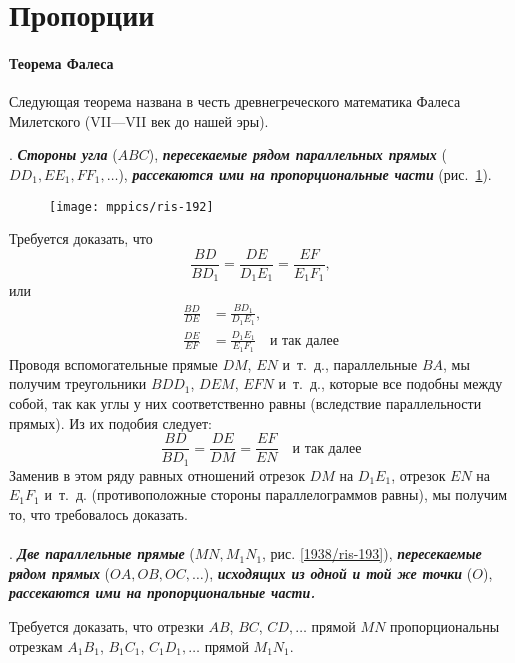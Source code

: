 \section{Пропорции} 

\paragraph{Теорема Фалеса}\label{1938/182}
Следующая теорема названа в честь древнегреческого математика Фалеса Милетского (VII—VII век до нашей эры).


\smallskip
{}.
\textbf{\emph{Стороны угла}} ($ABC$), \textbf{\emph{пересекаемые рядом параллельных прямых}} ($DD_1, EE_1, FF_1, \dots$), \textbf{\emph{рассекаются ими на пропорциональные части}} (рис.~\ref{1938/ris-192}).

\begin{figure}[!ht]
\centering
\texttt{[image: mppics/ris-192]}
\caption{}\label{1938/ris-192}
\end{figure}

Требуется доказать, что
\[\frac{BD}{BD_1}=\frac{DE}{D_1E_1}=\frac{EF}{E_1F_1},\]
или
\begin{align*}
\frac{BD}{DE}&=\frac{BD_1}{D_1E_1},
\\
\frac{DE}{EF}&=\frac{D_1E_1}{E_1F_1}\quad\text{и так далее}
\end{align*}
Проводя вспомогательные прямые $DM$, $EN$ и~т.~д., параллельные $BA$, мы получим треугольники $BDD_1$, $DEM$, $EFN$ и~т.~д., которые все подобны между собой, так как углы у них соответственно равны (вследствие параллельности прямых).
Из их подобия следует:
\[\frac{BD}{BD_1}=\frac{DE}{DM}=\frac{EF}{EN}\quad\text{и так далее}\]
Заменив в этом ряду равных отношений отрезок $DM$ на $D_1E_1$, отрезок $EN$ на $E_1F_1$ и~т.~д.
(противоположные стороны параллелограммов равны), мы получим то, что требовалось доказать.

\paragraph{}\label{1938/183}
.
\textbf{\emph{Две параллельные прямые}} ($MN, M_1N_1$, рис. \ref{1938/ris-193}), \textbf{\emph{пересекаемые рядом прямых}} ($OA, OB, OC, \dots$), \textbf{\emph{исходящих из одной и той же точки}} ($O$), \textbf{\emph{рассекаются ими на пропорциональные части.}}


Требуется доказать, что отрезки $AB$, $BC$, $CD,\dots$
прямой $MN$ пропорциональны отрезкам $A_1B_1$, $B_1C_1$, $C_1D_1,\dots$
прямой $M_1N_1$.

